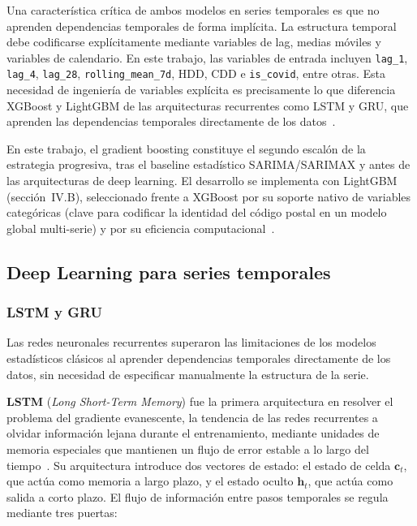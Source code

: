 \documentclass[12pt, a4paper]{article}
\begin{document}
Una característica crítica de ambos modelos en series temporales es que no aprenden dependencias temporales de forma implícita. La estructura temporal debe codificarse explícitamente mediante variables de lag, medias móviles y variables de calendario. En este trabajo, las variables de entrada incluyen \texttt{lag\_1}, \texttt{lag\_4}, \texttt{lag\_28}, \texttt{rolling\_mean\_7d}, HDD, CDD e \texttt{is\_covid}, entre otras. Esta necesidad de ingeniería de variables explícita es precisamente lo que diferencia XGBoost y LightGBM de las arquitecturas recurrentes como LSTM y GRU, que aprenden las dependencias temporales directamente de los datos~\cite{jiang2024, chen2016, ke2017}.

En este trabajo, el gradient boosting constituye el segundo escalón de la estrategia progresiva, tras el baseline estadístico SARIMA/SARIMAX y antes de las arquitecturas de deep learning. El desarrollo se implementa con LightGBM (sección~IV.B), seleccionado frente a XGBoost por su soporte nativo de variables categóricas (clave para codificar la identidad del código postal en un modelo global multi-serie) y por su eficiencia computacional~\cite{ke2017}.

\subsection{Deep Learning para series temporales}

\subsubsection{LSTM y GRU}

Las redes neuronales recurrentes superaron las limitaciones de los modelos estadísticos clásicos al aprender dependencias temporales directamente de los datos, sin necesidad de especificar manualmente la estructura de la serie.

\textbf{LSTM} (\textit{Long Short-Term Memory}) fue la primera arquitectura en resolver el problema del gradiente evanescente, la tendencia de las redes recurrentes a olvidar información lejana durante el entrenamiento, mediante unidades de memoria especiales que mantienen un flujo de error estable a lo largo del tiempo~\cite{hochreiter1997}. Su arquitectura introduce dos vectores de estado: el estado de celda $\mathbf{c}_t$, que actúa como memoria a largo plazo, y el estado oculto $\mathbf{h}_t$, que actúa como salida a corto plazo. El flujo de información entre pasos temporales se regula mediante tres puertas:
\end{document}
